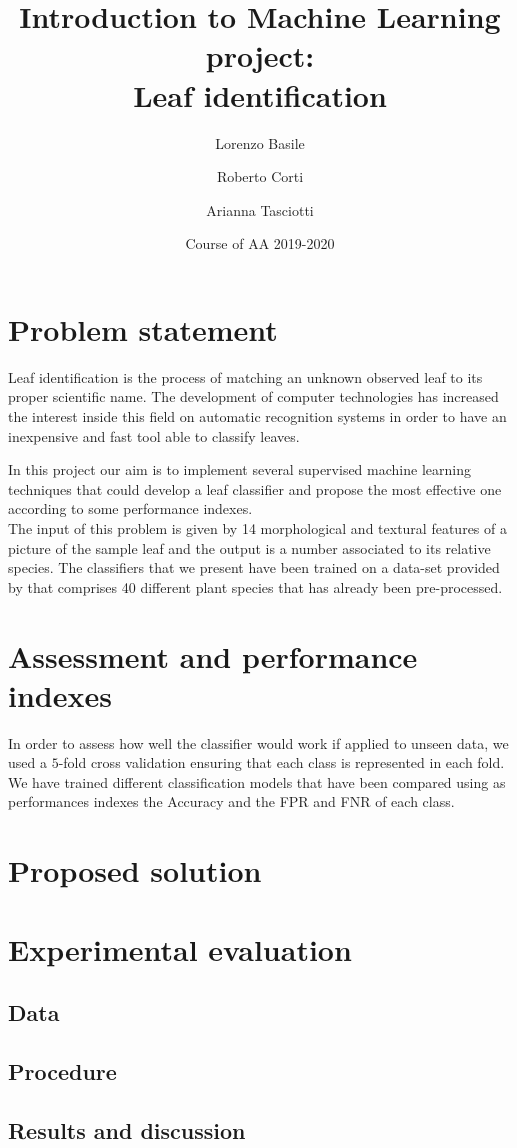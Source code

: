 \documentclass{article}
\title{Introduction to Machine Learning project:\\ Leaf identification}
\author[1]{Lorenzo Basile}
\author[2]{Roberto Corti}
\author[3]{Arianna Tasciotti}
\affil[1,2,3]{
    problem statement,
    solution design,
    solution development,
    writing
}
\date{Course of AA 2019-2020}
\begin{document}
\maketitle



\section{Problem statement}
Leaf identification is the process of matching an unknown observed leaf to its proper scientific name. The development of computer technologies has increased the interest inside this field on automatic recognition systems in order to have an inexpensive and fast tool able to classify leaves.  

In this project our aim is to implement several supervised machine learning techniques that could develop a leaf classifier and propose the most effective one according to some performance indexes. \\
The input of this problem is given by 14 morphological and textural features of a picture of the sample leaf and the output is a number associated to its relative species. The classifiers that we present have been trained on a data-set provided by \cite{silva} that comprises 40 different plant species that has already been pre-processed.


\section{Assessment and performance indexes}
In order to assess how well the classifier would work if applied to unseen data, we used a $5$-fold cross validation ensuring that each class is represented in each fold. We have trained different classification models that have been compared using as performances indexes the Accuracy and the FPR and FNR of each class.

\section{Proposed solution}



\section{Experimental evaluation}

\subsection{Data}

\subsection{Procedure}

\subsection{Results and discussion}



\newpage


\end{document}

